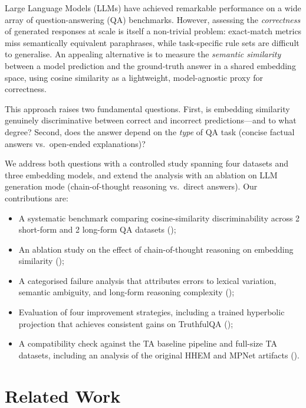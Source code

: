 \documentclass{article}
\begin{document}
Large Language Models (LLMs) have achieved remarkable performance on a wide array of
question-answering (QA) benchmarks.
However, assessing the \emph{correctness} of generated responses at scale is itself a
non-trivial problem: exact-match metrics miss semantically equivalent paraphrases,
while task-specific rule sets are difficult to generalise.
An appealing alternative is to measure the \emph{semantic similarity} between a model
prediction and the ground-truth answer in a shared embedding space, using cosine
similarity as a lightweight, model-agnostic proxy for correctness.

This approach raises two fundamental questions.
First, is embedding similarity genuinely discriminative between correct and incorrect
predictions---and to what degree?
Second, does the answer depend on the \emph{type} of QA task (concise factual answers
vs.\ open-ended explanations)?

We address both questions with a controlled study spanning four datasets and three
embedding models, and extend the analysis with an ablation on LLM generation mode
(chain-of-thought reasoning vs.\ direct answers).
Our contributions are:
\begin{itemize}[nosep]
  \item A systematic benchmark comparing cosine-similarity discriminability across
        2 short-form and 2 long-form QA datasets ();
  \item An ablation study on the effect of chain-of-thought reasoning on embedding
        similarity ();
  \item A categorised failure analysis that attributes errors to lexical variation,
        semantic ambiguity, and long-form reasoning complexity
        ();
  \item Evaluation of four improvement strategies, including a trained hyperbolic
        projection that achieves consistent gains on TruthfulQA
        ();
  \item A compatibility check against the TA baseline pipeline and full-size TA
        datasets, including an analysis of the original HHEM and MPNet artifacts
        ().
\end{itemize}

\section{Related Work}
\label{sec:related}
\end{document}
